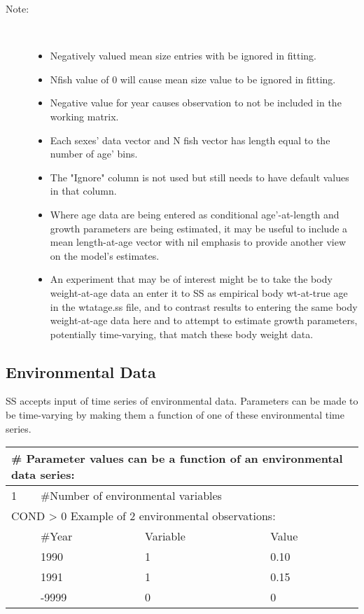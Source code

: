 \begin{description}
	\item[Note:]\
	\begin{itemize}
		\item Negatively valued mean size entries with be ignored in fitting.
		\item Nfish value of 0 will cause mean size value to be ignored in fitting.
		\item Negative value for year causes observation to not be included in the working matrix.
		\item Each sexes' data vector and N fish vector has length equal to the number of age' bins.
		\item The "Ignore" column is not used but still needs to have default values in that column.
		\item Where age data are being entered as conditional age’-at-length and growth parameters are being estimated, it may be useful to include a mean length-at-age vector with nil emphasis to provide another view on the model’s estimates.
		\item An experiment that may be of interest might be to take the body weight-at-age data an enter it to SS as empirical body wt-at-true age in the wtatage.ss file, and to contrast results to entering the same body weight-at-age data here and to attempt to estimate growth parameters, potentially time-varying, that match these body weight data.		
	\end{itemize}
\end{description}

\subsection{Environmental Data}
SS accepts input of time series of environmental data.  Parameters can be made to be time-varying by making them a function of one of these environmental time series.

\begin{center}
	\begin{tabular}{p{1cm} p{3cm} p{3cm} p{8cm}}
		\multicolumn{4}{l}{\# Parameter values can be a function of an environmental data series: }\\
		\hline
		1 & \multicolumn{3}{l}{\#Number of environmental variables}\\
		\hline
		\multicolumn{4}{l}{COND > 0  Example of 2 environmental observations:} \\
		  & \#Year & Variable & Value \\
		\hline
		  & 1990 & 1 & 0.10 \\
		  & 1991 & 1 & 0.15 \\
		  & -9999 & 0 & 0 \\
		\hline
	\end{tabular}
\end{center}

